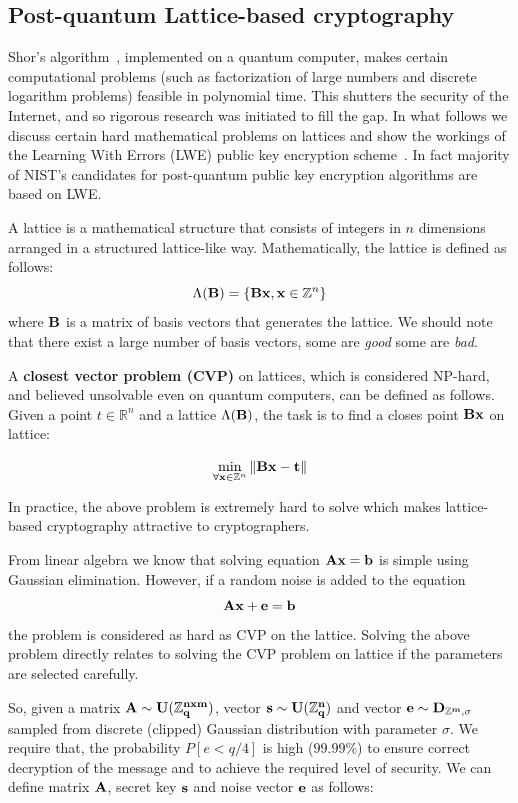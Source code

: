 \subsection{Post-quantum Lattice-based cryptography}

Shor's algorithm~\cite{shor}, implemented on a quantum computer, makes certain computational 
problems (such as factorization of large numbers and discrete logarithm problems) 
feasible in polynomial time. This shutters the security of the Internet, and 
so rigorous research was initiated to fill the gap. In what follows we discuss
certain hard mathematical problems on lattices and show the workings of the 
Learning With Errors (LWE) public key encryption scheme~\cite{regev}. In fact majority of 
NIST's candidates for post-quantum public key encryption algorithms are based 
on LWE.

A lattice is a mathematical structure that consists of integers in $n$ dimensions 
arranged in a structured lattice-like way. Mathematically, the lattice is defined as follows:
$$\Lambda({\bf B}) = \{{\bf Bx}, {\bf x} \in \mathbb{Z}^n \}$$ where ${\bf B}$ is a matrix of basis vectors
that generates the lattice. We should note that there exist a large number of basis vectors, some are {\it good}
some are {\it bad}.

A { \bf closest vector problem (CVP) } on lattices, which is considered NP-hard, and believed unsolvable even on 
quantum computers, can be defined as follows. Given a point $t \in \mathbb{R}^n$ and a lattice
$\Lambda({\bf B})$, the task is to find a closes point ${\bf Bx}$ on lattice: 

$$\min_{\forall {\bf x} \in \mathbb{Z}^n} \|{\bf Bx} - {\bf t}\|$$ 

In practice, the above problem is extremely hard to solve which makes lattice-based cryptography 
attractive to cryptographers.

From linear algebra we know that solving equation $\bf{Ax}=\bf{b}$ is simple using
Gaussian elimination. However, if a random noise is added to the equation $$\bf{Ax} + \bf{e} = \bf{b}$$ the 
problem is considered as hard as CVP on the lattice. Solving the above problem directly relates to 
solving the CVP problem on lattice if the parameters are selected carefully.

So, given a matrix $\bf{A} \sim U(\mathbb{Z}^{nxm}_q)$, vector $\bf{s} \sim U(\mathbb{Z}^{n}_q)$ and 
vector $\bf{e} \sim D_{\mathbb{Z}^{m}, \sigma}$ sampled from discrete (clipped) Gaussian distribution with parameter $\sigma$. We require that, the probability
$P[e < q/4]$ is high (\ie $99.99\%$) to ensure correct decryption of the message and to achieve the required 
level of security. We can define matrix ${\bf A}$, secret key ${\bf s}$ and noise vector ${\bf e}$ as follows:

